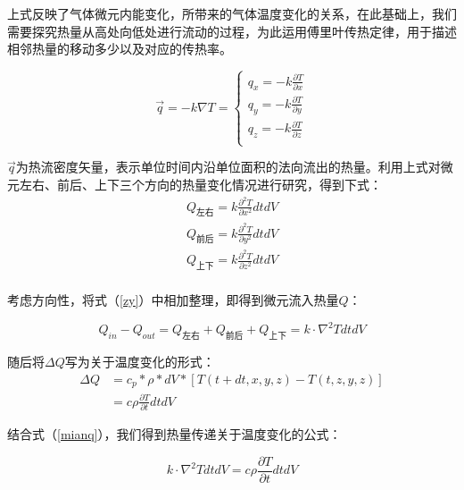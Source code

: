 \documentclass{my_paper}
\begin{document}
上式反映了气体微元内能变化，所带来的气体温度变化的关系，在此基础上，我们需要探究热量从高处向低处进行流动的过程，为此运用傅里叶传热定律\cite{2}，用于描述相邻热量的移动多少以及对应的传热率。

\begin{equation}
    \vec{q} = -k\nabla T =\begin{cases}
        q_x = -k \frac{\partial T}{\partial  x}\\
        q_y = -k \frac{\partial T}{\partial  y}\\
        q_z = -k \frac{\partial T}{\partial  z}\\
    \end{cases} 
\end{equation}

$ \vec{q} $为热流密度矢量，表示单位时间内沿单位面积的法向流出的热量。利用上式对微元左右、前后、上下三个方向的热量变化情况进行研究，得到下式：
\begin{equation}
    \begin{aligned}
        Q_{\text{左右}} = k\frac{\partial^2 T}{\partial x^2} dtdV\\
        Q_{\text{前后}} = k\frac{\partial^2 T}{\partial y^2} dtdV\\
        Q_{\text{上下}} = k\frac{\partial^2 T}{\partial z^2} dtdV\\
    \end{aligned}
    \label{zy}
\end{equation}

考虑方向性，将式（\ref{zy}）中相加整理，即得到微元流入热量$Q$：

\begin{equation}
    Q_{in}-Q_{out} = Q_{\text{左右}}+Q_{\text{前后}}+Q_{\text{上下}} = k\cdot \nabla^2 T dtdV
\end{equation}

随后将$\Delta Q$写为关于温度变化的形式：
\begin{equation}
    \begin{aligned}
        \Delta Q &= c_p * \rho * dV * [T(t+dt,x,y,z)-T(t,z,y,z)]\\
        &=c\rho \frac{\partial T}{\partial t}dtdV
    \end{aligned}
\end{equation}

结合式（\ref{mianq}），我们得到热量传递关于温度变化的公式：

\begin{equation}
    k\cdot \nabla^2 T dtdV = c\rho \frac{\partial T}{\partial t}dtdV
\label{}
\end{equation}
\end{document}

